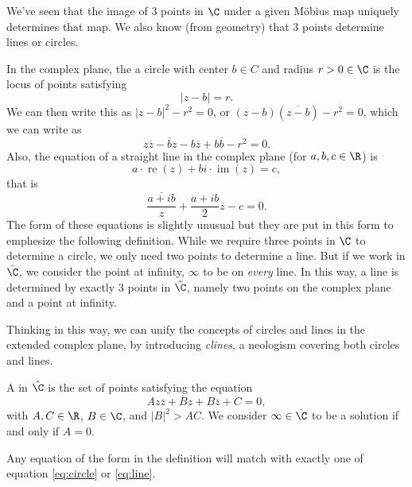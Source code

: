 \documentclass[a4]{scrreprt}
\begin{document}
We've seen that the image of 3 points in $\C$ under a given Möbius map uniquely determines that map. We also know (from geometry) that 3 points determine lines or circles. 

In the complex plane, the a circle with center $b \in C$ and radius $r > 0 \in \C$ is the locus of points satisfying
$$
|z - b| = r.
$$
We can then write this as $|z - b|^2 - r^2 = 0$, or $(z - b)(\overline{z - b}) - r^2 = 0$, which we can write as
\begin{equation}\label{eq:circle}
	z \overline{z} - \overline{b}z - b \overline{z} + b \overline{b} - r^2 = 0.
	\tag{$*$}
\end{equation}
Also, the equation of a straight line in the complex plane (for $a, b, c \in \R$) is
$$
	a \cdot \operatorname{re}(z) + bi \cdot \operatorname{im}(z) = c,
$$
that is
\begin{equation}\label{eq:line}
\frac{\overline{a + i b}}{z} + \frac{a + ib}{2} \overline{z} - c = 0.
\tag{$\dagger$}	
\end{equation}
The form of these equations is slightly unusual but they are put in this form to emphesize the following definition.
While we require three points in $\C$ to determine a circle, we only need two points to determine a line. But if we work in $\hat{\C}$, we consider the point at infinity, $\infty$ to be on \emph{every} line. In this way, a line is determined by exactly 3 points in $\hat{\C}$, namely two points on the complex plane and a point at infinity.

Thinking in this way, we can unify the concepts of circles and lines in the extended complex plane, by introducing \emph{clines}, a neologism covering both circles and lines. 

\begin{definition}
A  in $\hat{\C}$ is the set of points satisfying the equation
$$
A z \overline{z} + \overline{B}z + B \overline{z} + C = 0,
$$
with $A, C \in \R$, $B \in \C$, and $|B|^2 > AC$. We consider $\infty \in \hat{\C}$ to be a solution if and only if $A = 0$.  
\end{definition}

Any equation of the form in the definition will match with exactly one of equation \eqref{eq:circle} or \eqref{eq:line}.
\end{document}
